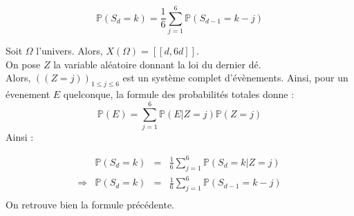 \[
  \mathbb{P}(S_d=k) = \frac{1}{6}\sum\limits_{j=1}^{6}\mathbb{P}(S_{d-1}=k-j)
\]

\bigskip

Soit $\Omega$ l'univers. Alors, $X(\Omega) = [\![d, 6d]\!]$.\\
On pose $Z$ la variable aléatoire donnant la loi du dernier dé. \\
Alors, $((Z=j))_{1\leq j\leq 6}$ est un système complet d'évènements.
Ainsi, pour un évenement $E$ quelconque, la formule des probabilités totales donne :
\[
  \mathbb{P}(E) = \sum\limits_{j=1}^{6}\mathbb{P}(E | Z = j)\mathbb{P}(Z=j)
\]
Ainsi :

\[
  \begin{array}{lrcl}
                & \mathbb{P}(S_d=k) & = & \frac{1}{6}\sum\limits_{j=1}^{6}\mathbb{P}(S_d=k | Z = j)  \\
    \Rightarrow & \mathbb{P}(S_d=k) & = & \frac{1}{6}\sum\limits_{j=1}^{6}\mathbb{P}(S_{d-1}= k - j) \\
  \end{array}
\]
On retrouve bien la formule précédente.

